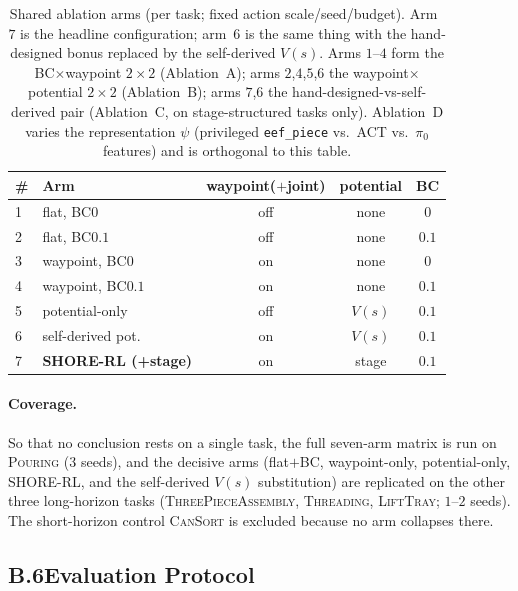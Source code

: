\documentclass[letterpaper]{article} %
\begin{document}
\begin{table}[t]
\centering\small\setlength{\tabcolsep}{4pt}
\begin{tabular}{@{}llccc@{}}
\toprule
\# & Arm & waypoint($+$joint) & potential & BC \\
\midrule
1 & flat, BC$0$             & off & none      & $0$   \\
2 & flat, BC$0.1$           & off & none      & $0.1$ \\
3 & waypoint, BC$0$          & on  & none      & $0$   \\
4 & waypoint, BC$0.1$        & on  & none      & $0.1$ \\
5 & potential-only          & off & $V(s)$    & $0.1$ \\
6 & self-derived pot.       & on  & $V(s)$    & $0.1$ \\
7 & \textbf{SHORE-RL (+stage)} & on & stage   & $0.1$ \\
\bottomrule
\end{tabular}
\caption{Shared ablation arms (per task; fixed action scale/seed/budget). Arm~$7$ is
the headline configuration; arm~$6$ is the same thing with the hand-designed bonus
replaced by the self-derived $V(s)$. Arms $1$--$4$ form the BC$\times$waypoint
$2\times2$ (Ablation~A); arms $2$,$4$,$5$,$6$ the waypoint$\times$potential $2\times2$
(Ablation~B); arms $7$,$6$ the hand-designed-vs-self-derived pair (Ablation~C, on
stage-structured tasks only). Ablation~D varies the representation $\psi$
(privileged \texttt{eef\_piece} vs.\ ACT vs.\ $\pi_0$ features) and is orthogonal to
this table.}
\label{tab:simarms}
\end{table}

\paragraph{Coverage.}
So that no conclusion rests on a single task, the full seven-arm matrix is run on
\textsc{Pouring} ($3$ seeds), and the decisive arms (flat$+$BC, waypoint-only,
potential-only, SHORE-RL, and the self-derived $V(s)$ substitution) are replicated on
the other three long-horizon tasks (\textsc{ThreePieceAssembly}, \textsc{Threading},
\textsc{LiftTray}; $1$--$2$ seeds). The short-horizon control \textsc{CanSort} is
excluded because no arm collapses there.

\subsection{B.6\quad Evaluation Protocol}
\end{document}
